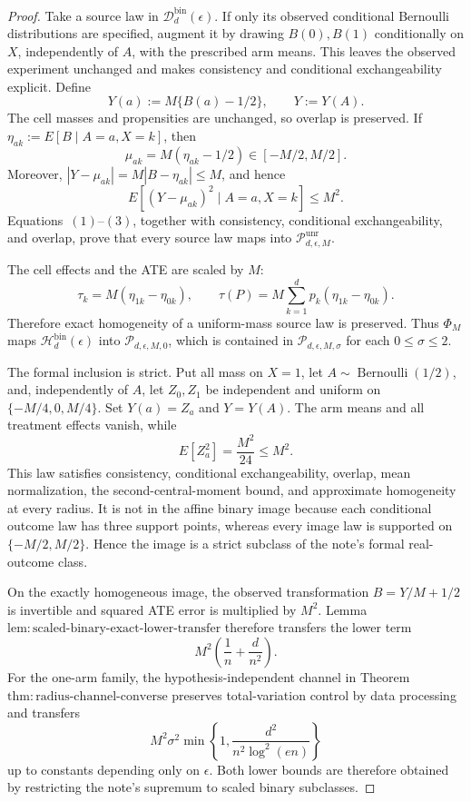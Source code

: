\documentclass{article}
\begin{document}
\begin{proof}
Take a source law in \(\mathcal D_d^{\mathrm{bin}}(\epsilon)\).  If only its observed conditional Bernoulli distributions are specified, augment it by drawing \(B(0),B(1)\) conditionally on \(X\), independently of \(A\), with the prescribed arm means.  This leaves the observed experiment unchanged and makes consistency and conditional exchangeability explicit.  Define
\[
 Y(a):=M\{B(a)-1/2\},\qquad Y:=Y(A).
\tag{1}
\]
The cell masses and propensities are unchanged, so overlap is preserved.  If
\(
 \eta_{ak}:=E[B\mid A=a,X=k]
\), then
\[
 \mu_{ak}=M(\eta_{ak}-1/2)\in[-M/2,M/2].
\tag{2}
\]
Moreover, \(|Y-\mu_{ak}|=M|B-\eta_{ak}|\le M\), and hence
\[
 E[(Y-\mu_{ak})^2\mid A=a,X=k]\le M^2.
\tag{3}
\]
Equations~\((1)\)--\((3)\), together with consistency, conditional exchangeability, and overlap, prove that every source law maps into \(\mathcal P_{d,\epsilon,M}^{\mathrm{unr}}\).

The cell effects and the ATE are scaled by \(M\):
\[
 \tau_k=M(\eta_{1k}-\eta_{0k}),
 \qquad
 \tau(P)=M\sum_{k=1}^dp_k(\eta_{1k}-\eta_{0k}).
\tag{4}
\]
Therefore exact homogeneity of a uniform-mass source law is preserved.  Thus \(\Phi_M\) maps \(\mathcal H_d^{\mathrm{bin}}(\epsilon)\) into \(\mathcal P_{d,\epsilon,M,0}\), which is contained in \(\mathcal P_{d,\epsilon,M,\sigma}\) for each \(0\le\sigma\le2\).

The formal inclusion is strict.  Put all mass on \(X=1\), let \(A\sim\operatorname{Bernoulli}(1/2)\), and, independently of \(A\), let \(Z_0,Z_1\) be independent and uniform on \(\{-M/4,0,M/4\}\).  Set \(Y(a)=Z_a\) and \(Y=Y(A)\).  The arm means and all treatment effects vanish, while
\[
 E[Z_a^2]=\frac{M^2}{24}\le M^2.
\tag{5}
\]
This law satisfies consistency, conditional exchangeability, overlap, mean normalization, the second-central-moment bound, and approximate homogeneity at every radius.  It is not in the affine binary image because each conditional outcome law has three support points, whereas every image law is supported on \(\{-M/2,M/2\}\).  Hence the image is a strict subclass of the note's formal real-outcome class.

On the exactly homogeneous image, the observed transformation \(B=Y/M+1/2\) is invertible and squared ATE error is multiplied by \(M^2\).  Lemma~\(\mathrm{lem:scaled\text{-}binary\text{-}exact\text{-}lower\text{-}transfer}\) therefore transfers the lower term
\[
 M^2\left(\frac1n+\frac d{n^2}\right).
\tag{6}
\]
For the one-arm family, the hypothesis-independent channel in Theorem~\(\mathrm{thm:radius\text{-}channel\text{-}converse}\) preserves total-variation control by data processing and transfers
\[
 M^2\sigma^2\min\left\{1,
 \frac{d^2}{n^2\log^2(en)}\right\}
\tag{7}
\]
up to constants depending only on \(\epsilon\).  Both lower bounds are therefore obtained by restricting the note's supremum to scaled binary subclasses.


\end{proof}
\end{document}
